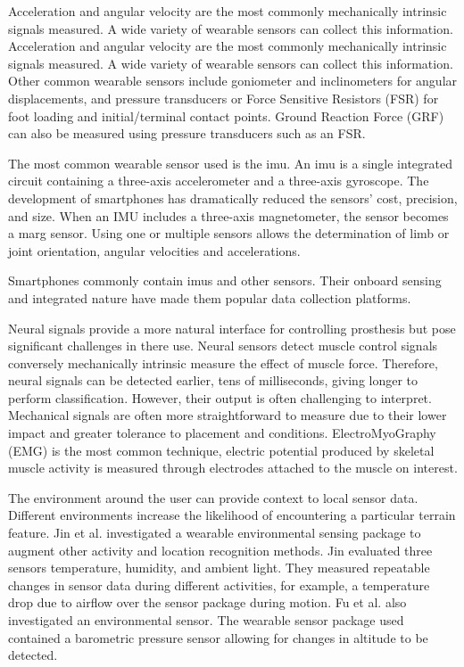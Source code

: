 Acceleration and angular velocity are the most commonly mechanically intrinsic signals measured. A wide variety of wearable sensors can collect this information.\cite{Shull2014, Tucker2015} Acceleration and angular velocity are the most commonly mechanically intrinsic signals measured. A wide variety of wearable sensors can collect this information. Other common wearable sensors include goniometer and inclinometers for angular displacements, and pressure transducers or Force Sensitive Resistors (FSR) for foot loading and initial/terminal contact points. Ground Reaction Force (GRF) can also be measured using pressure transducers such as an FSR\cite{Schepers2007}.

The most common wearable sensor used is the \acrfull{imu}\cite{Shull2014}. An \acrshort{imu} is a single integrated circuit containing a three-axis accelerometer and a three-axis gyroscope. The development of smartphones has dramatically reduced the sensors' cost, precision, and size. When an IMU includes a three-axis magnetometer, the sensor becomes a \acrfull{marg} sensor. Using one or multiple sensors allows the determination of limb or joint orientation, angular velocities and accelerations. 

Smartphones commonly contain \acrshort{imu}s and other sensors. Their onboard sensing and integrated nature have made them popular data collection platforms\cite{Garcia-Gonzalez2020, Mutegeki2020}.

Neural signals provide a more natural interface for controlling prosthesis\cite{He2018} but pose significant challenges in there use. Neural sensors detect muscle control signals conversely mechanically intrinsic measure the effect of muscle force. Therefore, neural signals can be detected earlier, tens of milliseconds\cite{Tucker2015}, giving longer to perform classification. However, their output is often challenging to interpret. Mechanical signals are often more straightforward to measure due to their lower impact and greater tolerance to placement and conditions.\cite{Koller2018} ElectroMyoGraphy (EMG) is the most common technique, electric potential produced by skeletal muscle activity is measured through electrodes attached to the muscle on interest.

The environment around the user can provide context to local sensor data. Different environments increase the likelihood of encountering a particular terrain feature.\cite{Tucker2015, Tschiedel2020} Jin et al. investigated a wearable environmental sensing package to augment other activity and location recognition methods. Jin evaluated three sensors temperature, humidity, and ambient light. They measured repeatable changes in sensor data during different activities, for example, a temperature drop due to airflow over the sensor package during motion.\cite{Jin2014} Fu et al. also investigated an environmental sensor. The wearable sensor package used contained a barometric pressure sensor allowing for changes in altitude to be detected\cite{Fu2021}.

